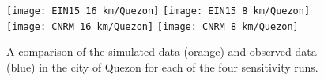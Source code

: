 \begin{figure}	
	\centering
	\texttt{[image: EIN15 16 km/Quezon]}
	\texttt{[image: EIN15 8 km/Quezon]}
	\texttt{[image: CNRM 16 km/Quezon]}
	\texttt{[image: CNRM 8 km/Quezon]}
	\caption{
		A comparison of the simulated data (orange) and observed data (blue) in the city of Quezon for each of the four sensitivity runs.
	}
	\label{fig:appendix-sim-vs-observed-quezon}
\end{figure}